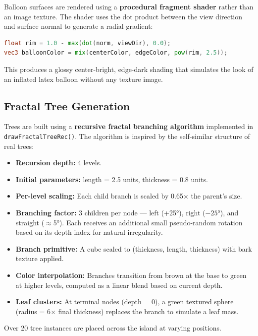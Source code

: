 \documentclass[12pt,a4paper]{article}
\begin{document}
Balloon surfaces are rendered using a \textbf{procedural fragment shader} rather than an image texture. The shader uses the dot product between the view direction and surface normal to generate a radial gradient:

\begin{lstlisting}[language=GLSL]
float rim = 1.0 - max(dot(norm, viewDir), 0.0);
vec3 balloonColor = mix(centerColor, edgeColor, pow(rim, 2.5));
\end{lstlisting}

This produces a glossy center-bright, edge-dark shading that simulates the look of an inflated latex balloon without any texture image.

\subsection{Fractal Tree Generation}

Trees are built using a \textbf{recursive fractal branching algorithm} implemented in \texttt{drawFractalTreeRec()}. The algorithm is inspired by the self-similar structure of real trees:

\begin{itemize}[noitemsep]
    \item \textbf{Recursion depth:} 4 levels.
    \item \textbf{Initial parameters:} length = 2.5 units, thickness = 0.8 units.
    \item \textbf{Per-level scaling:} Each child branch is scaled by 0.65$\times$ the parent's size.
    \item \textbf{Branching factor:} 3 children per node --- left (+25°), right ($-25$°), and straight ($\approx$5°). Each receives an additional small pseudo-random rotation based on its depth index for natural irregularity.
    \item \textbf{Branch primitive:} A cube scaled to (thickness, length, thickness) with bark texture applied.
    \item \textbf{Color interpolation:} Branches transition from brown at the base to green at higher levels, computed as a linear blend based on current depth.
    \item \textbf{Leaf clusters:} At terminal nodes (depth = 0), a green textured sphere (radius = 6$\times$ final thickness) replaces the branch to simulate a leaf mass.
\end{itemize}

Over 20 tree instances are placed across the island at varying positions.
\end{document}
